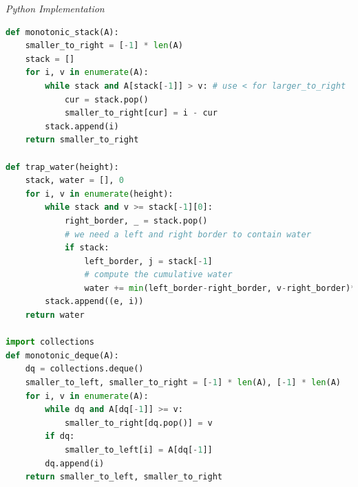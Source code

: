 \documentclass{article}
\begin{document}
\vspace{8pt} \emph{Python Implementation}
\begin{lstlisting}[language=Python]
def monotonic_stack(A):
    smaller_to_right = [-1] * len(A)
    stack = []
    for i, v in enumerate(A):
        while stack and A[stack[-1]] > v: # use < for larger_to_right
            cur = stack.pop()
            smaller_to_right[cur] = i - cur
        stack.append(i)
    return smaller_to_right

def trap_water(height):
    stack, water = [], 0
    for i, v in enumerate(height):
        while stack and v >= stack[-1][0]:
            right_border, _ = stack.pop()
            # we need a left and right border to contain water
            if stack:
                left_border, j = stack[-1]
                # compute the cumulative water
                water += min(left_border-right_border, v-right_border)*(i-j-1)
        stack.append((e, i))
    return water

import collections
def monotonic_deque(A):
    dq = collections.deque()
    smaller_to_left, smaller_to_right = [-1] * len(A), [-1] * len(A)
    for i, v in enumerate(A):
        while dq and A[dq[-1]] >= v: 
            smaller_to_right[dq.pop()] = v 
        if dq:  
            smaller_to_left[i] = A[dq[-1]]
        dq.append(i)
    return smaller_to_left, smaller_to_right
\end{lstlisting}
\end{document}
